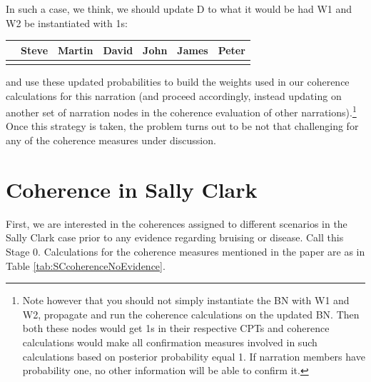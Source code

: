 \documentclass[10pt,]{scrartcl}
\begin{document}
In such a case, we think, we should update \textsf{D} to what it would
be had \textsf{W1} and \textsf{W2} be instantiated with 1s:

\begin{table}[H]
\centering
\begin{tabular}{lrrrrrr}
\toprule
  & Steve & Martin & David & John & James & Peter\\
\midrule
\cellcolor{gray!6}{Pr} & \cellcolor{gray!6}{0.981} & \cellcolor{gray!6}{0.004} & \cellcolor{gray!6}{0.004} & \cellcolor{gray!6}{0.004} & \cellcolor{gray!6}{0.004} & \cellcolor{gray!6}{0.004}\\
\bottomrule
\end{tabular}
\end{table}

\noindent and use these updated probabilities to build the weights used
in our coherence calculations for this narration (and proceed
accordingly, instead updating on another set of narration nodes in the
coherence evaluation of other
narrations).\footnote{Note  however that  you should not simply instantiate the BN with \textsf{W1} and \textsf{W2}, propagate and run the coherence calculations on the updated BN. Then both these nodes would get 1s in their respective CPTs and coherence calculations would make   all  confirmation measures involved in such calculations  based on posterior probability equal 1. If narration members have probability one, no other information will be able to confirm it.}
Once this strategy is taken, the problem turns out to be not that
challenging for any of the coherence measures under discussion.




\section{Coherence in Sally Clark}\label{sec:Sally}


First, we are interested in the coherences assigned to different scenarios in the Sally Clark case prior to any evidence regarding bruising or disease. Call this Stage 0. Calculations for the coherence measures mentioned in the paper are as in Table \ref{tab:SCcoherenceNoEvidence}.

\pagebreak 
\end{document}
